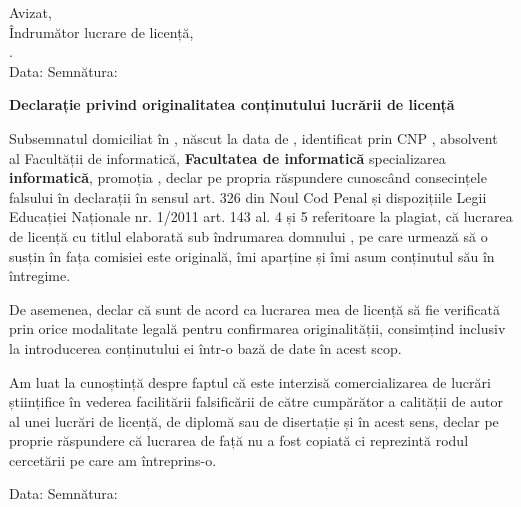 \vspace*{\fill}

\begin{flushright}
    Avizat, \\
    Îndrumător lucrare de licență, \\
    \coordinator. \\
    Data: \dottedline \hspace{1cm} Semnătura: \dottedline
\end{flushright}

\vspace{1cm}
\begin{center}
    \large
    \textbf{Declarație privind originalitatea conținutului lucrării de licență}
\end{center}

Subsemnatul \textbf{\authornamelf} domiciliat în \textbf{\authoraddress}, născut la data de \textbf{\authorbirth}, identificat prin 
CNP \textbf{\authorcnp}, absolvent al Facultății de informatică, \textbf{Facultatea de informatică} specializarea \textbf{informatică}, 
promoția \promotion, declar pe propria răspundere cunoscând consecințele falsului în declarații în sensul art. 326 din Noul Cod Penal și 
dispozițiile Legii Educației Naționale nr. 1/2011 art. 143 al. 4 și 5 referitoare la plagiat, că lucrarea de licență cu titlul 
\textbf{\thesistitle} elaborată sub îndrumarea domnului \textbf{\coordinator}, pe care urmează să o susțin în fața comisiei este 
originală, îmi aparține și îmi asum conținutul său în întregime.

De asemenea, declar că sunt de acord ca lucrarea mea de licență să fie verificată prin orice modalitate legală pentru confirmarea 
originalității, consimțind inclusiv la introducerea conținutului ei într-o bază de date în acest scop.

Am luat la cunoștință despre faptul că este interzisă comercializarea de lucrări științifice în vederea facilitării falsificării de 
către cumpărător a calității de autor al unei lucrări de licență, de diplomă sau de disertație și în acest sens, declar pe proprie 
răspundere că lucrarea de față nu a fost copiată ci reprezintă rodul cercetării pe care am întreprins-o.

\begin{flushright}
    Data: \dottedline \hspace{6cm} Semnătura: \dottedline
\end{flushright}

\vspace*{\fill}
\pagebreak